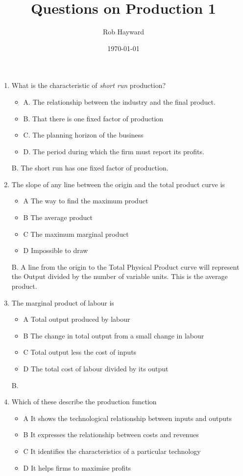 \documentclass[12pt, a4paper, oneside]{article}\usepackage[]{graphicx}\usepackage[]{color}
\begin{document}
\title{Questions on Production 1}
\author{Rob Hayward} 
\date{\today}
\maketitle

\begin{enumerate}
\item What is the characteristic of \emph{short run} production? 
\begin{itemize}
\item A.  The relationship between the industry and the final product. 
\item B.   That there is one fixed factor of production
\item C.   The planning horizon of the business
\item D.    The period during which the firm must report its profits. 
\end{itemize}

B. The short run has one fixed factor of production. 

\item The slope of any line between the origin and the total product curve is
\begin{itemize}
\item A The way to find the maximum product
\item B The average product
\item C The maximum marginal product
\item D Impossible to draw
\end{itemize}

B.  A line from the origin to the Total Physical Product curve will represent the Output divided by the number of variable units.  This is the average product. 


\item The marginal product of labour is 
\begin{itemize}
\item A Total output produced by labour
\item B The change in total output from a small change in labour
\item C Total output less the cost of inputs
\item D The total cost of labour divided by its output
\end{itemize}

B. 

\item Which of these describe the production function
\begin{itemize}
\item A It shows the technological relationship between inputs and outputs
\item B  It expresses the relationship between costs and revenues
\item C It identifies the characteristics of a particular technology
\item  D It helps firms to maximise profits
\end{itemize}


\end{enumerate}
\end{document}
